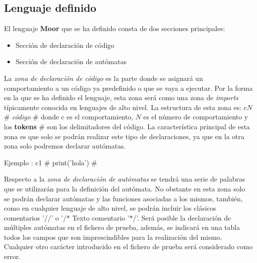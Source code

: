 \documentclass[12pt,a4paper]{article}
\begin{document}
{\subsection{Lenguaje definido}
El lenguaje \textbf{Moor} que se ha definido consta de dos secciones principales:
\begin{itemize}
	\item Sección de declaración de código
	\item Sección de declaración de autómatas
\end{itemize}
La \textit{zona de declaración de código} es la parte donde se asignará un comportamiento a un código ya predefinido o que se vaya a ejecutar. Por la forma en la que se ha definido el lenguaje, esta zona será como una zona de \textit{imports} típicamente conocida en lenguajes de alto nivel. \newline \newline
La estructura de esta zona es: c$N$ $\#$ \textit{código} $\#$ donde c es el comportamiento, $N$ es el número de comportamiento y los \textbf{tokens} $\#$ son los delimitadores del código. \newline La característica principal de esta zona es que solo se podrán realizar este tipo de declaraciones, ya que en la otra zona solo podremos declarar autómatas.
\begin{center}
	Ejemplo : c1 $\#$ print('hola') $\#$
\end{center}
Respecto a la \textit{zona de declaración de autómatas} se tendrá una serie de palabras que se utilizarán para la definición del autómata. No obstante en esta zona solo se podrán declarar autómatas y las funciones asociadas a los mismos, también, como en cualquier lenguaje de alto nivel, se podrán incluir los clásicos comentarios '//' o '/$\ast$ Texto comentario '$\ast$/'.
\newline \newline
Será posible la declaración de múltiples autómatas en el fichero de prueba, además, se indicará en una tabla todos los campos que son imprescindibles para la realización del mismo.
Cualquier otro carácter introducido en el fichero de prueba será considerado como error.

}
\end{document}
